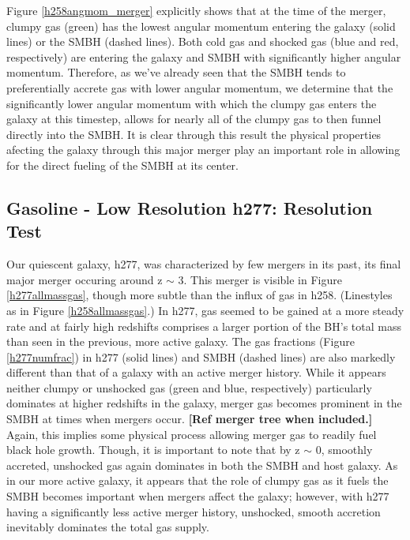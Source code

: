 \documentclass[manuscript]{aastex}
\begin{document}
Figure \ref{h258angmom_merger} explicitly shows that at the time of the merger, clumpy gas (green) has the lowest angular momentum entering the galaxy (solid lines) or the SMBH (dashed lines). Both cold gas and shocked gas (blue and red, respectively) are entering the galaxy and SMBH with significantly higher angular momentum. Therefore, as we've already seen that the SMBH tends to preferentially accrete gas with lower angular momentum, we determine that the significantly lower angular momentum with which the clumpy gas enters the galaxy at this timestep, allows for nearly all of the clumpy gas to then funnel directly into the SMBH. It is clear through this result the physical properties afecting the galaxy through this major merger play an important role in allowing for the direct fueling of the SMBH at its center.

\subsection{Gasoline - Low Resolution h277: Resolution Test}
	
Our quiescent galaxy, h277, was characterized by few mergers in its past, its final major merger occuring around z $\sim$ 3. This merger is visible in Figure \ref{h277allmassgas}, though more subtle than the influx of gas in h258. (Linestyles as in Figure \ref{h258allmassgas}.) In h277, gas seemed to be gained at a more steady rate and at fairly high redshifts comprises a larger portion of the BH's total mass than seen in the previous, more active galaxy. The gas fractions (Figure \ref{h277numfrac}) in h277 (solid lines) and SMBH (dashed lines) are also markedly different than that of a galaxy with an active merger history. While it appears neither clumpy or unshocked gas (green and blue, respectively) particularly dominates at higher redshifts in the galaxy, merger gas becomes prominent in the SMBH at times when mergers occur. \textbf{[Ref merger tree when included.]} Again, this implies some physical process allowing merger gas to readily fuel black hole growth. Though, it is important to note that by z $\sim$ 0, smoothly accreted, unshocked gas again dominates in both the SMBH and host galaxy. As in our more active galaxy, it appears that the role of clumpy gas as it fuels the SMBH becomes important when mergers affect the galaxy; however, with h277 having a significantly less active merger history, unshocked, smooth accretion inevitably dominates the total gas supply.
\end{document}
